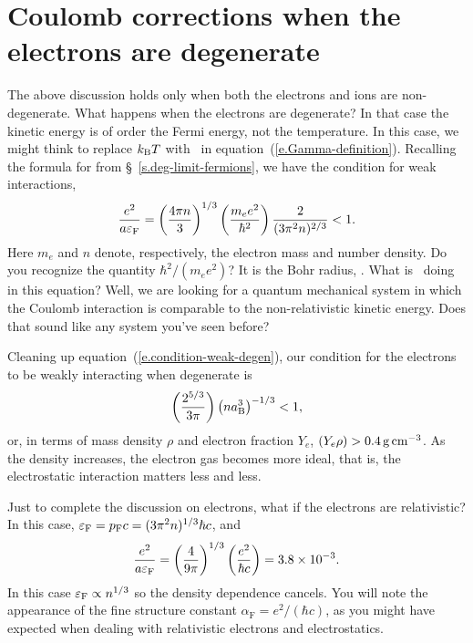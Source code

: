 \section[Strongly Coupled Plasmas]{Coulomb corrections when the electrons are degenerate}\label{s.degenerate-coulomb}

The above discussion holds only when both the electrons and ions are non-degenerate.  What happens when the electrons are degenerate?  In that case the kinetic energy is of order the Fermi energy, not the temperature.  In this case, we might think to replace $k_\mathrm{B} T$ with \eF\ in equation~(\ref{e.Gamma-definition}). Recalling the formula for \eF from \S~\ref{s.deg-limit-fermions}, we have the condition for weak interactions,
\begin{equation}\label{e.condition-weak-degen}
\frac{e^{2}}{a \varepsilon_{\mathrm{F}}} = \left(\frac{4\pi n}{3}\right)^{1/3}\left(\frac{m_{e} e^{2}}{\hbar^{2}}\right)\frac{2}{(3\pi^{2} n)^{2/3}} < 1.
\end{equation}
Here $m_{e}$ and $n$ denote, respectively, the electron mass and number density.  Do you recognize the quantity $\hbar^{2}/(m_{e}e^{2})$?  It is the Bohr radius, \abohr.  What is \abohr\ doing in this equation?  Well, we are looking for a quantum mechanical system in which the Coulomb interaction is comparable to the non-relativistic kinetic energy.  Does that sound like any system you've seen before?

Cleaning up equation~(\ref{e.condition-weak-degen}), our condition for the electrons to be weakly interacting when degenerate is
\begin{equation}
\left(\frac{2^{5/3}}{3\pi}\right)\left( n a_{\mathrm{B}}^{3}\right)^{-1/3} < 1,
\end{equation}
or, in terms of mass density $\rho$ and electron fraction $Y_{e}$, $(Y_{e}\rho) > 0.4\,\mathrm{g}\,{\mathrm{c}\mathrm{m}}^{-3}$.  As the density increases, the electron gas becomes more ideal, that is, the electrostatic interaction matters less and less.  

Just to complete the discussion on electrons, what if the electrons are relativistic?  In this case, $\varepsilon_{\mathrm{F}} = p_{\mathrm{F}} c = (3\pi^{2}n)^{1/3}\hbar c$, and
\begin{equation}\label{e.condition-weak-rel-degen}
\frac{e^{2}}{a \varepsilon_{\mathrm{F}}} = \left(\frac{4}{9\pi}\right)^{1/3}\left(\frac{e^{2}}{\hbar c}\right) = 3.8\times 10^{-3}.
\end{equation}
In this case $\varepsilon_{\mathrm{F}} \propto n^{1/3}$ so the density dependence cancels.  You will note the appearance of the fine structure constant $\alpha_{\mathrm{F}} = e^{2}/(\hbar c)$, as you might have expected when dealing with relativistic electrons and electrostatics.

